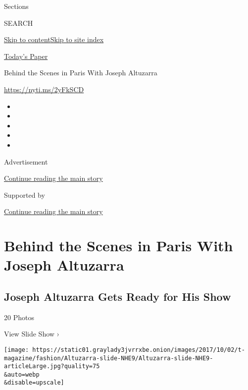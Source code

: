 Sections

SEARCH

\protect\hyperlink{site-content}{Skip to
content}\protect\hyperlink{site-index}{Skip to site index}

\href{https://myaccount.nytimes3xbfgragh.onion/auth/login?response_type=cookie\&client_id=vi}{}

\href{https://www.nytimes3xbfgragh.onion/section/todayspaper}{Today's
Paper}

Behind the Scenes in Paris With Joseph Altuzarra

\url{https://nyti.ms/2yFkSCD}

\begin{itemize}
\item
\item
\item
\item
\item
\end{itemize}

Advertisement

\protect\hyperlink{after-top}{Continue reading the main story}

Supported by

\protect\hyperlink{after-sponsor}{Continue reading the main story}

\hypertarget{behind-the-scenes-in-paris-with-joseph-altuzarra}{%
\section{Behind the Scenes in Paris With Joseph
Altuzarra}\label{behind-the-scenes-in-paris-with-joseph-altuzarra}}

\href{https://www.nytimes3xbfgragh.onion/slideshow/2017/10/02/t-magazine/fashion/joseph-altuzarra-gets-ready-for-his-show.html}{}

\hypertarget{joseph-altuzarra-gets-ready-for-his-show}{%
\subsection{Joseph Altuzarra Gets Ready for His
Show}\label{joseph-altuzarra-gets-ready-for-his-show}}

20 Photos

View Slide Show ›

\texttt{[image: https://static01.graylady3jvrrxbe.onion/images/2017/10/02/t-magazine/fashion/Altuzarra-slide-NHE9/Altuzarra-slide-NHE9-articleLarge.jpg?quality=75\\\&auto=webp\\\&disable=upscale]}

